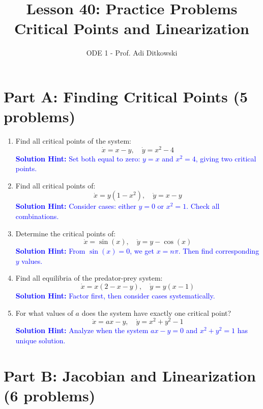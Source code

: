 \documentclass[12pt]{article}
\title{Lesson 40: Practice Problems\\
\large Critical Points and Linearization}
\author{ODE 1 - Prof. Adi Ditkowski}
\date{}
\newcommand{\solution}[1]{\textcolor{blue}{\textbf{Solution Hint:} #1}}
\begin{document}
\maketitle

\section*{Part A: Finding Critical Points (5 problems)}

\begin{enumerate}
\item Find all critical points of the system:
$$\dot{x} = x - y, \quad \dot{y} = x^2 - 4$$
\solution{Set both equal to zero: $y = x$ and $x^2 = 4$, giving two critical points.}

\item Find all critical points of:
$$\dot{x} = y(1-x^2), \quad \dot{y} = x - y$$
\solution{Consider cases: either $y = 0$ or $x^2 = 1$. Check all combinations.}

\item Determine the critical points of:
$$\dot{x} = \sin(x), \quad \dot{y} = y - \cos(x)$$
\solution{From $\sin(x) = 0$, we get $x = n\pi$. Then find corresponding $y$ values.}

\item Find all equilibria of the predator-prey system:
$$\dot{x} = x(2 - x - y), \quad \dot{y} = y(x - 1)$$
\solution{Factor first, then consider cases systematically.}

\item For what values of $a$ does the system have exactly one critical point?
$$\dot{x} = ax - y, \quad \dot{y} = x^2 + y^2 - 1$$
\solution{Analyze when the system $ax - y = 0$ and $x^2 + y^2 = 1$ has unique solution.}
\end{enumerate}

\section*{Part B: Jacobian and Linearization (6 problems)}
\end{document}
